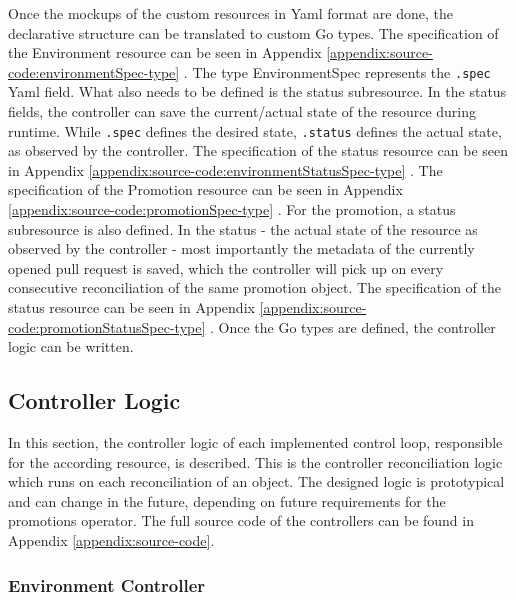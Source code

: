 Once the mockups of the custom resources in Yaml format are done,
the declarative structure can be translated to custom Go types.
The specification of the Environment resource can be seen in Appendix
\ref{appendix:source-code:environmentSpec-type} .
The type EnvironmentSpec represents the \lstinline|.spec| Yaml field.
What also needs to be defined is the status subresource.
In the status fields, the controller can save the current/actual state
of the resource during runtime.
While \lstinline|.spec| defines the desired state,
\lstinline|.status| defines the actual state, as observed by the controller.
The specification of the status resource can be seen in Appendix
\ref{appendix:source-code:environmentStatusSpec-type} .
The specification of the Promotion resource can be seen in Appendix
\ref{appendix:source-code:promotionSpec-type} .
For the promotion,
a status subresource is also defined.
In the status - the actual state of the resource as observed by the controller -
most importantly the metadata of the currently opened pull request is saved,
which the controller will pick up on every consecutive reconciliation
of the same promotion object.
The specification of the status resource can be seen in Appendix
\ref{appendix:source-code:promotionStatusSpec-type} .
Once the Go types are defined,
the controller logic can be written.

\subsection{Controller Logic}
\label{prototype:design:controller-logic}

In this section,
the controller logic of each implemented control loop, responsible for the according resource,
is described.
This is the controller reconciliation logic which runs on each reconciliation of an object.
The designed logic is prototypical and can change in the future, depending on future requirements
for the promotions operator.
The full source code of the controllers can be found in Appendix
\ref{appendix:source-code}.


\subsubsection*{Environment Controller}

